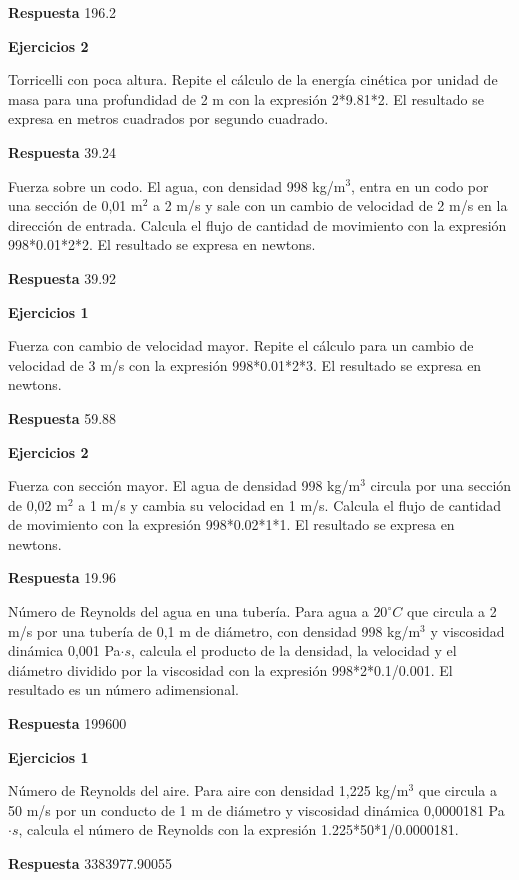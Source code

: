 \documentclass{book}
\begin{document}
\noindent\textbf{Respuesta} 196.2

\noindent\textbf{Ejercicios 2}

Torricelli con poca altura. Repite el cálculo de la energía cinética por unidad de masa para una profundidad de 2 m con la expresión 2*9.81*2. El resultado se expresa en metros cuadrados por segundo cuadrado.

\noindent\textbf{Respuesta} 39.24

Fuerza sobre un codo. El agua, con densidad 998 kg/m\(^{3}\), entra en un codo por una sección de 0,01 m\(^{2}\) a 2 m/s y sale con un cambio de velocidad de 2 m/s en la dirección de entrada. Calcula el flujo de cantidad de movimiento con la expresión 998*0.01*2*2. El resultado se expresa en newtons.

\noindent\textbf{Respuesta} 39.92

\noindent\textbf{Ejercicios 1}

Fuerza con cambio de velocidad mayor. Repite el cálculo para un cambio de velocidad de 3 m/s con la expresión 998*0.01*2*3. El resultado se expresa en newtons.

\noindent\textbf{Respuesta} 59.88

\noindent\textbf{Ejercicios 2}

Fuerza con sección mayor. El agua de densidad 998 kg/m\(^{3}\) circula por una sección de 0,02 m\(^{2}\) a 1 m/s y cambia su velocidad en 1 m/s. Calcula el flujo de cantidad de movimiento con la expresión 998*0.02*1*1. El resultado se expresa en newtons.

\noindent\textbf{Respuesta} 19.96

Número de Reynolds del agua en una tubería. Para agua a \(20 ^{\circ}C\) que circula a 2 m/s por una tubería de 0,1 m de diámetro, con densidad 998 kg/m\(^{3}\) y viscosidad dinámica 0,001 Pa\(\cdot s\), calcula el producto de la densidad, la velocidad y el diámetro dividido por la viscosidad con la expresión 998*2*0.1/0.001. El resultado es un número adimensional.

\noindent\textbf{Respuesta} 199600

\noindent\textbf{Ejercicios 1}

Número de Reynolds del aire. Para aire con densidad 1,225 kg/m\(^{3}\) que circula a 50 m/s por un conducto de 1 m de diámetro y viscosidad dinámica 0,0000181 Pa\(\cdot s\), calcula el número de Reynolds con la expresión 1.225*50*1/0.0000181.

\noindent\textbf{Respuesta} 3383977.90055
\end{document}

